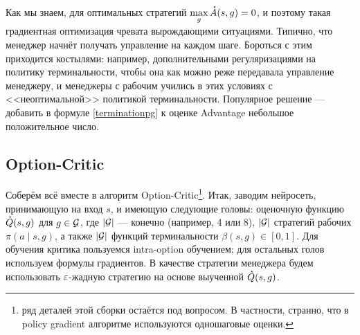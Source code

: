 Как мы знаем, для оптимальных стратегий $\max\limits_{g} \accentset{\star}{A}(s, g) = 0$, и поэтому такая градиентная оптимизация чревата вырождающими ситуациями. Типично, что менеджер начнёт получать управление на каждом шаге. Бороться с этим приходится костылями: например, дополнительными регуляризациями на политику терминальности, чтобы она как можно реже передавала управление менеджеру, и менеджеры с рабочим учились в этих условиях с <<неоптимальной>> политикой терминальности. Популярное решение --- добавить в формуле \eqref{terminationpg} к оценке Advantage небольшое положительное число.

\subsection{Option-Critic}

Соберём всё вместе в алгоритм Option-Critic\footnote{ряд деталей этой сборки остаётся под вопросом. В частности, странно, что в policy gradient алгоритме используются одношаговые оценки.}. Итак, заводим нейросеть, принимающую на вход $s$, и имеющую следующие головы: оценочную функцию $\accentset{\star}{Q}(s, g)$ для $g \in \mathcal{G}$, где $|\mathcal{G}|$ --- конечно (например, 4 или 8), $|\mathcal{G}|$ стратегий рабочих $\pi(a \mid s, g)$, а также $|\mathcal{G}|$ функций терминальности $\beta(s, g) \in [0, 1]$. Для обучения критика пользуемся intra-option обучением; для остальных голов используем формулы градиентов. В качестве стратегии менеджера будем использовать $\varepsilon$-жадную стратегию на основе выученной $\accentset{\star}{Q}(s, g)$.

